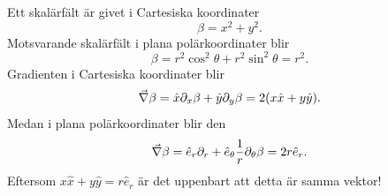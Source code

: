 \documentclass[%
oneside,                 %
final,                   %
10pt]{article}
\newenvironment{notice_mdfboxadmon}[1][]{
\begin{notice_mdfboxmdframed}[frametitle=#1]
}
{
\end{notice_mdfboxmdframed}
}
\begin{document}
\begin{notice_mdfboxadmon}
Ett skalärfält är givet i Cartesiska koordinater
\begin{equation}
\beta = x^2 + y^2.
\end{equation}
Motsvarande skalärfält i plana polärkoordinater blir
\begin{equation}
\beta = r^2\cos^2\theta + r^2 \sin^2\theta = r^2.
\end{equation}
Gradienten i Cartesiska koordinater blir
\begin{equation}
\vec{\nabla} \beta = \hat{x} \partial_x \beta + \hat{y} \partial_y \beta = 2 (x \hat{x} + y \hat{y}).
\end{equation}
Medan i plana polärkoordinater blir den
\begin{equation}
\vec{\nabla} \beta = \hat{e}_r \partial_r + \hat{e}_\theta \frac{1}{r} \partial_\theta \beta = 2 r \hat{e}_r.
\end{equation}
Eftersom $x \hat{x} + y \hat{y} = r \hat{e}_r$ är det uppenbart att detta är samma vektor!
\end{notice_mdfboxadmon} %
\end{document}
